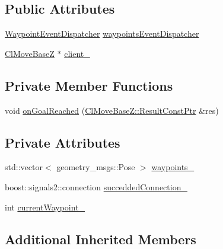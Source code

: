 \subsection*{Public Attributes}
\begin{DoxyCompactItemize}
\item 
\hyperlink{classmove__base__z__client_1_1WaypointEventDispatcher}{Waypoint\+Event\+Dispatcher} \hyperlink{classmove__base__z__client_1_1WaypointNavigator_a488a89db6cd20bc12548ac454254829f}{waypoints\+Event\+Dispatcher}
\item 
\hyperlink{classmove__base__z__client_1_1ClMoveBaseZ}{Cl\+Move\+BaseZ} $\ast$ \hyperlink{classmove__base__z__client_1_1WaypointNavigator_aadb289ffdaeda3a751fe569a2ee84c48}{client\+\_\+}
\end{DoxyCompactItemize}
\subsection*{Private Member Functions}
\begin{DoxyCompactItemize}
\item 
void \hyperlink{classmove__base__z__client_1_1WaypointNavigator_ae4c5a879ff016f197c1cec54b2adaa1b}{on\+Goal\+Reached} (\hyperlink{classmove__base__z__client_1_1ClMoveBaseZ_a3b774d99d3dd4526f99b968d65ef5834}{Cl\+Move\+Base\+Z\+::\+Result\+Const\+Ptr} \&res)
\end{DoxyCompactItemize}
\subsection*{Private Attributes}
\begin{DoxyCompactItemize}
\item 
std\+::vector$<$ geometry\+\_\+msgs\+::\+Pose $>$ \hyperlink{classmove__base__z__client_1_1WaypointNavigator_a83e4e39987eaf1c8856d32d581eb4cd0}{waypoints\+\_\+}
\item 
boost\+::signals2\+::connection \hyperlink{classmove__base__z__client_1_1WaypointNavigator_a139d492345875777d9c9a79f9b2d494b}{succedded\+Connection\+\_\+}
\item 
int \hyperlink{classmove__base__z__client_1_1WaypointNavigator_a7da763128724f7b08c32c79cb3a88934}{current\+Waypoint\+\_\+}
\end{DoxyCompactItemize}
\subsection*{Additional Inherited Members}


